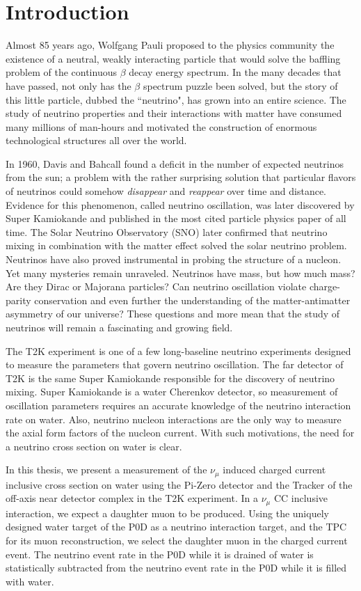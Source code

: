 \section{Introduction}
\label{sec:Introduction}

Almost 85 years ago, Wolfgang Pauli proposed to the physics community the existence of a neutral, weakly interacting particle that would solve the baffling problem of the continuous $\beta$ decay energy spectrum. In the many decades that have passed, not only has the $\beta$ spectrum puzzle been solved, but the story of this little particle, dubbed the ``neutrino", has grown into an entire science. The study of neutrino properties and their interactions with matter have consumed many millions of man-hours and motivated the construction of enormous technological structures all over the world. 

In 1960, Davis and Bahcall found a deficit in the number of expected neutrinos from the sun; a problem with the rather surprising solution that particular flavors of neutrinos could somehow \emph{disappear} and \emph{reappear} over time and distance. Evidence for this phenomenon, called neutrino oscillation, was later discovered by Super Kamiokande and published in the most cited particle physics paper of all time. The Solar Neutrino Observatory (SNO) later confirmed that neutrino mixing in combination with the matter effect solved the solar neutrino problem. Neutrinos have also proved instrumental in probing the structure of a nucleon. Yet many mysteries remain unraveled. Neutrinos have mass, but how much mass? Are they Dirac or Majorana particles? Can neutrino oscillation violate charge-parity conservation and even further the understanding of the matter-antimatter asymmetry of our universe? These questions and more mean that the study of neutrinos will remain a fascinating and growing field.

The T2K experiment is one of a few long-baseline neutrino experiments designed to measure the parameters that govern neutrino oscillation. The far detector of T2K is the same Super Kamiokande responsible for the discovery of neutrino mixing. Super Kamiokande is a water Cherenkov detector, so measurement of oscillation parameters requires an accurate knowledge of the neutrino interaction rate on water. Also, neutrino nucleon interactions are the only way to measure the axial form factors of the nucleon current. With such motivations, the need for a neutrino cross section on water is clear.

In this thesis, we present a measurement of the $\nu_\mu$ induced charged current inclusive cross section on water using the Pi-Zero detector and the Tracker of the off-axis near detector complex in the T2K experiment. In a $\nu_\mu$ CC inclusive interaction, we expect a daughter muon to be produced. Using the uniquely designed water target of the P0D as a neutrino interaction target, and the TPC for its muon reconstruction, we select the daughter muon in the charged current event. The neutrino event rate in the P0D while it is drained of water is statistically subtracted from the neutrino event rate in the P0D while it is filled with water.

